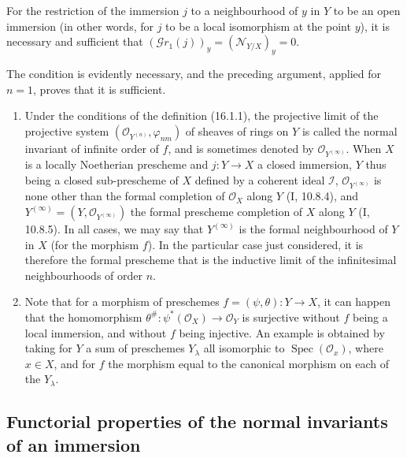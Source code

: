 \begin{corollary}[16.1.10]
\label{IV.16.1.10}
For the restriction of the immersion $j$ to a neighbourhood of $y$ in $Y$ to be
an open immersion (in other words, for $j$ to be a local isomorphism at the
point $y$), it is necessary and sufficient that
$(\mathscr{G}r_1(j))_y=(\mathscr{N}_{Y/X})_y=0$.
\end{corollary}

The condition is evidently necessary, and the preceding argument, applied
for $n=1$, proves that it is sufficient.

\begin{remarks}[16.1.11]\label{IV.16.1.11}
\begin{enumerate}
\item[(i)] Under the conditions of the definition (16.1.1), the projective limit
of the projective system
$(\mathcal{O}_{Y^{(n)}},\varphi_{nm})$ of sheaves of rings on $Y$ is
called the normal invariant of infinite order of $f$, and is sometimes denoted by
$\mathcal{O}_{Y^{(\infty)}}$. When $X$ is a locally
Noetherian prescheme and $j:Y\to X$ a closed immersion, $Y$ thus being a closed
sub-prescheme of $X$ defined by a coherent ideal $\mathscr{I}$,
$\mathcal{O}_{Y^{(\infty)}}$ is none other than the formal completion of
$\mathcal{O}_X$ along $Y$ (I, 10.8.4), and
$Y^{(\infty)}=(Y,\mathcal{O}_{Y^{(\infty)}})$ the formal prescheme completion of
$X$ along $Y$ (I, 10.8.5). In all cases, we may say that
$Y^{(\infty)}$ is the formal neighbourhood of $Y$ in $X$ (for the morphism
$f$). In the particular case just considered, it is therefore the formal
prescheme that is the inductive limit of the infinitesimal neighbourhoods of order $n$.
\item[(ii)] Note that for a morphism of preschemes
$f=(\psi,\theta):Y\to X$, it can happen that the homomorphism
$\theta^\#:\psi^*(\mathcal{O}_X)\to\mathcal{O}_Y$ is surjective without $f$
being a local
immersion, and without $f$ being injective. An example is obtained by taking for $Y$
a sum of preschemes $Y_\lambda$ all isomorphic to
$\operatorname{Spec}(\mathcal{O}_x)$, where $x\in X$, and for $f$ the morphism
equal to the canonical morphism on each of the $Y_\lambda$.
\end{enumerate}
\end{remarks}

\subsection{Functorial properties of the normal invariants of an immersion}

